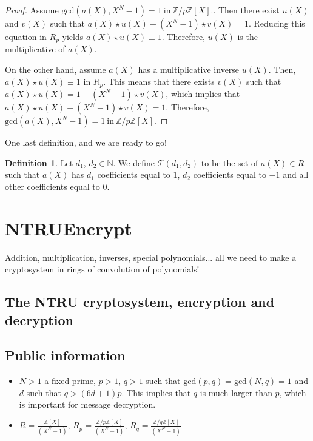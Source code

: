 \documentclass[12pt]{article}
\theoremstyle{definition}
\newtheorem{definition}{Definition}[section]
\theoremstyle{proposition}
\theoremstyle{remark}
\theoremstyle{theorem}
\theoremstyle{example}
\newcommand{\N}{\mathbb{N}}
\newcommand{\Z}{\mathbb{Z}}
\begin{document}
\begin{proof}
    Assume $\mathrm{gcd}(a(X), X^N-1) = 1 \: \mathrm{ in } \:  \Z/p\Z[X].$. Then there exist $u(X)$ and $v(X)$ such that $a(X) \star u(X) + (X^N -1)\star v(X) = 1$. Reducing this equation in $R_p$ yields $a(X) \star u(X) \equiv 1$. Therefore, $u(X)$ is the multiplicative of $a(X)$.

    On the other hand, assume $a(X)$ has a multiplicative inverse $u(X)$. Then, $a(X) \star u(X) \equiv 1$ in $R_p$. This means that there exists $v(X)$ such that $a(X) \star u(X) = 1 + (X^N-1)\star v(X)$, which implies that $a(X) \star u(X) - (X^N-1)\star v(X) = 1$. Therefore, $\mathrm{gcd}(a(X), X^N-1) = 1 \: \mathrm{ in } \: \Z/p\Z[X].$
\end{proof}

One last definition, and we are ready to go!

\begin{definition}
    Let $d_1$, $d_2 \in \N$. We define  $\mathcal{T}(d_1,d_2)$ to be the set of $a(X) \in R$ such that $a(X)$ has $d_1$ coefficients equal to $1$, $d_2$ coefficients equal to $-1$ and all other coefficients equal to $0$.  
\end{definition}

\section{NTRUEncrypt}

Addition, multiplication, inverses, special polynomials... all we need to make a cryptosystem in rings of convolution of polynomials!

\subsection{The NTRU cryptosystem, encryption and decryption}

\subsection*{Public information}
    \begin{itemize}
        \item $N > 1$ a fixed prime, $p > 1$, $q > 1$ such that $\mathrm{gcd}(p,q) = \mathrm{gcd}(N,q)=1$ and $d$ such that $q > (6d+1)p$. This implies that $q$ is much larger than $p$, which is important for message decryption.
        \item $R = \frac{\Z[X]}{(X^N-1)}$, $R_p = \frac{\Z/p\Z[X]}{(X^N-1)}$, $R_q = \frac{\Z/q\Z[X]}{(X^N-1)}$
    \end{itemize}
\end{document}

